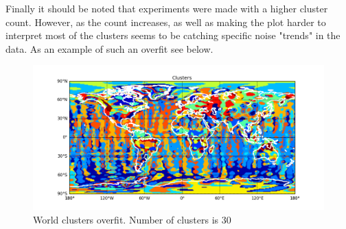 Finally it should be noted that experiments were made with a higher cluster count. However, as the count increases, as well as making the plot harder to interpret most of the clusters seems to be catching specific noise "trends" in the data. As an example of such an overfit see below.
\begin{figure}[H]
	\center
	\includegraphics[width=\textwidth]{figures/world_clusters_overfit.png}
	\caption{World clusters overfit. Number of clusters is 30}
	\label{fig:world_clusters}
\end{figure}